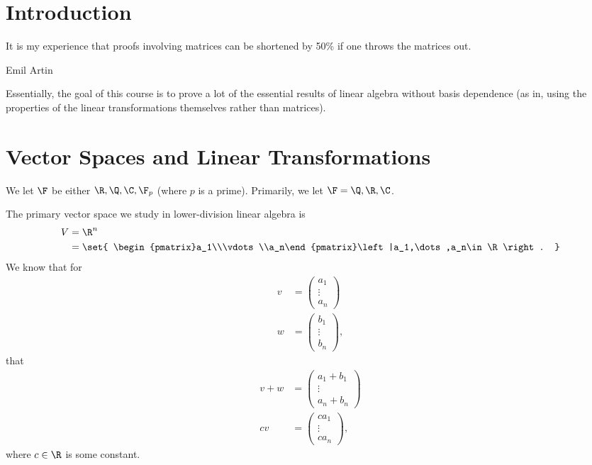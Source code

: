 \documentclass[12pt]{mypackage}
\begin{document}
\section{Introduction}%
\epigraph{It is my experience that proofs involving matrices can be shortened by 50\% if one throws the matrices out.}{Emil Artin}
Essentially, the goal of this course is to prove a lot of the essential results of linear algebra without basis dependence (as in, using the properties of the linear transformations themselves rather than matrices).
\section{Vector Spaces and Linear Transformations}%
\begin{remark}
We let $\F$ be either $\R,\Q,\C,\F_{p}$ (where $p$ is a prime). Primarily, we let $\F = \Q,\R,\C$.\newline
\end{remark}
\begin{example}
  The primary vector space we study in lower-division linear algebra is
  \begin{align*}
    V &= \R^n\\
      &= \set{ \begin{pmatrix}a_1\\\vdots\\a_n\end{pmatrix}\left|a_1,\dots,a_n\in \R\right. }
  \end{align*}
  We know that for
  \begin{align*}
    v &= \begin{pmatrix}a_1\\\vdots\\a_n\end{pmatrix}\\
    w &= \begin{pmatrix}b_1\\\vdots\\b_n\end{pmatrix},
  \end{align*}
  that
  \begin{align*}
    v+w &= \begin{pmatrix}a_1 + b_1\\\vdots\\a_n + b_n\end{pmatrix}\\
    cv &= \begin{pmatrix}ca_1 \\\vdots\\ca_n\end{pmatrix},
  \end{align*}
  where $c\in\R$ is some constant.
\end{example}
\end{document}
